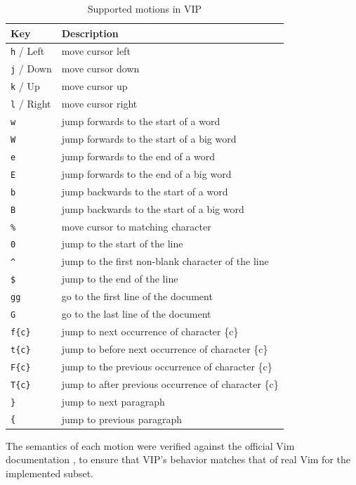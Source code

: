 \documentclass[journal]{IEEEtran}
\begin{document}
\begin{table}[htbp]
\centering
\caption{Supported motions in VIP}
\label{tab:motions}
\begin{tabular}{ll}
\hline
Key & Description \\
\hline
\texttt{h} / Left & move cursor left \\
\texttt{j} / Down & move cursor down \\
\texttt{k} / Up & move cursor up \\
\texttt{l} / Right & move cursor right \\
\texttt{w} & jump forwards to the start of a word \\
\texttt{W} & jump forwards to the start of a big word \\
\texttt{e} & jump forwards to the end of a word \\
\texttt{E} & jump forwards to the end of a big word \\
\texttt{b} & jump backwards to the start of a word \\
\texttt{B} & jump backwards to the start of a big word \\
\texttt{\%} & move cursor to matching character \\
\texttt{0} & jump to the start of the line \\
\texttt{\^} & jump to the first non-blank character of the line \\
\texttt{\$} & jump to the end of the line \\
\texttt{gg} &  go to the first line of the document \\
\texttt{G} & go to the last line of the document \\
\texttt{f\{c\}} & jump to next occurrence of character \{c\} \\
\texttt{t\{c\}} & jump to before next occurrence of character \{c\} \\
\texttt{F\{c\}} & jump to the previous occurrence of character \{c\} \\
\texttt{T\{c\}} & jump to after previous occurrence of character \{c\} \\
\texttt{\}} & jump to next paragraph \\
\texttt{\{} & jump to previous paragraph \\
\hline
\end{tabular}
\end{table}

The semantics of each motion were verified against the official Vim documentation \cite{vimhelp}, to ensure that VIP's behavior matches that of real Vim for the implemented subset.
\end{document}
